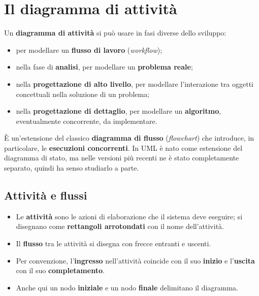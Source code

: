 \section{Il diagramma di attività}

Un \textbf{diagramma di attività} si può usare in fasi diverse dello sviluppo:
\begin{itemize}
  \item per modellare un \textbf{flusso di lavoro} (\textit{workflow});
  \item nella fase di \textbf{analisi}, per modellare un \textbf{problema reale};
  \item nella \textbf{progettazione di alto livello}, per modellare l'interazione tra oggetti concettuali nella soluzione di un problema;
  \item nella \textbf{progettazione di dettaglio}, per modellare un \textbf{algoritmo}, eventualmente concorrente, da implementare.
\end{itemize}

È un'estensione del classico \textbf{diagramma di flusso} (\textit{flowchart}) che introduce, in particolare, le \textbf{esecuzioni
concorrenti}. In UML è nato come estensione del diagramma di stato, ma nelle versioni più recenti ne è stato completamente separato,
quindi ha senso studiarlo a parte.

\subsection{Attività e flussi}

\begin{minipage}[c]{0.6\textwidth}
\begin{itemize}
  \item Le \textbf{attività} sono le azioni di elaborazione che il sistema deve eseguire; si disegnano come
        \textbf{rettangoli arrotondati} con il nome dell'attività.
  \item Il \textbf{flusso} tra le attività si disegna con frecce entranti e uscenti.
  \item Per convenzione, l'\textbf{ingresso} nell'attività coincide con il suo \textbf{inizio} e l'\textbf{uscita} con il suo
        \textbf{completamento}.
  \item Anche qui un nodo \textbf{iniziale} e un nodo \textbf{finale} delimitano il diagramma.
\end{itemize}
\end{minipage}\hfill
\begin{minipage}[c]{0.36\textwidth}
\centering
{}
\end{minipage}


